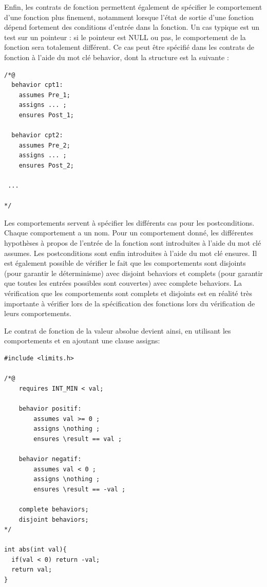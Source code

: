 \noindent Enfin, les contrats de fonction permettent également de spécifier le comportement d'une fonction plus finement, notamment lorsque l'état de sortie d'une fonction dépend fortement des conditions d'entrée dans la fonction. Un cas typique est un test sur un pointeur : si le pointeur est NULL ou pas, le comportement de la fonction sera totalement différent. Ce cas peut être spécifié dans les contrats de fonction à l'aide du mot clé behavior, dont la structure est la suivante :

\begin{lstlisting}
/*@
  behavior cpt1:
  	assumes Pre_1;
  	assigns ... ;
  	ensures Post_1;

  behavior cpt2:
  	assumes Pre_2;
  	assigns ... ;
  	ensures Post_2;

 ...

*/

\end{lstlisting}

\noindent Les comportements servent à spécifier les différents cas pour les postconditions.  Chaque comportement a un nom. Pour un comportement donné, les différentes hypothèses à propos de l’entrée de la fonction sont introduites à l’aide du mot clé assumes. Les postconditions sont enfin introduites à l'aide du mot clé ensures.
Il est également possible de vérifier le fait que les comportements sont disjoints (pour garantir le déterminisme) avec disjoint behaviors et complets (pour garantir que toutes les entrées possibles sont couvertes) avec complete behaviors. La vérification que les comportements sont complets et disjoints est en réalité très importante à vérifier lors de la spécification des fonctions lors du vérification de leurs comportements.


Le contrat de fonction de la valeur absolue devient ainsi, en utilisant les comportements et en ajoutant une clause assigns:
\begin{lstlisting}
#include <limits.h>

/*@
  	requires INT_MIN < val;

  	behavior positif:
  		assumes val >= 0 ;
  		assigns \nothing ;
  		ensures \result == val ;

  	behavior negatif:
  		assumes val < 0 ;
  		assigns \nothing ;
  		ensures \result == -val ;

  	complete behaviors;
  	disjoint behaviors;
*/

int abs(int val){
  if(val < 0) return -val;
  return val;
}
\end{lstlisting}



